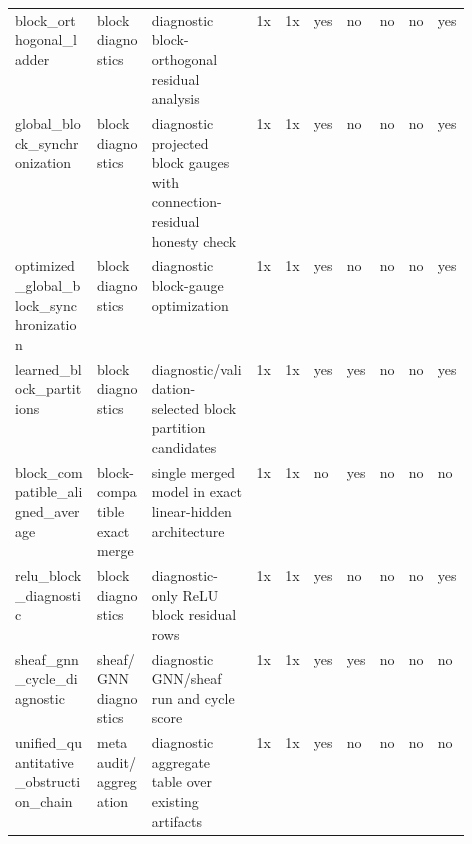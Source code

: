 \begin{longtable}{p{0.18\linewidth}p{0.12\linewidth}p{0.23\linewidth}lllllll}
block\_orthogonal\_ladder & block diagnostics & diagnostic block-orthogonal residual analysis & 1x & 1x & yes & no & no & no & yes \\
global\_block\_synchronization & block diagnostics & diagnostic projected block gauges with connection-residual honesty check & 1x & 1x & yes & no & no & no & yes \\
optimized\_global\_block\_synchronization & block diagnostics & diagnostic block-gauge optimization & 1x & 1x & yes & no & no & no & yes \\
learned\_block\_partitions & block diagnostics & diagnostic/validation-selected block partition candidates & 1x & 1x & yes & yes & no & no & yes \\
block\_compatible\_aligned\_average & block-compatible exact merge & single merged model in exact linear-hidden architecture & 1x & 1x & no & yes & no & no & no \\
relu\_block\_diagnostic & block diagnostics & diagnostic-only ReLU block residual rows & 1x & 1x & yes & no & no & no & yes \\
sheaf\_gnn\_cycle\_diagnostic & sheaf/GNN diagnostics & diagnostic GNN/sheaf run and cycle score & 1x & 1x & yes & yes & no & no & no \\
unified\_quantitative\_obstruction\_chain & meta audit/aggregation & diagnostic aggregate table over existing artifacts & 1x & 1x & yes & no & no & no & no \\
\bottomrule
\end{longtable}
